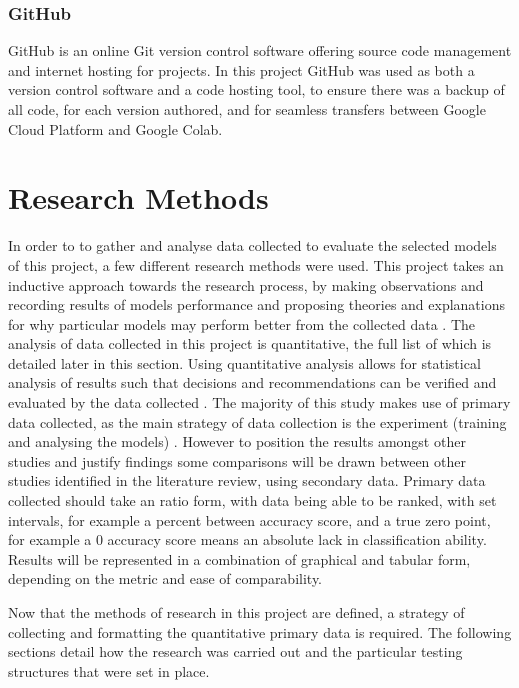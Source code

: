 \subsubsection{GitHub}
GitHub is an online Git version control software offering source code management and internet hosting for projects. In this project GitHub was used as both a version control software and a code hosting tool, to ensure there was a backup of all code, for each version authored, and for seamless transfers between Google Cloud Platform and Google Colab.

\section{Research Methods}
In order to to gather and analyse data collected to evaluate the selected models of this project, a few different research methods were used. This project takes an inductive approach towards the research process, by making observations and recording results of models performance and proposing theories and explanations for why particular models may perform better from the collected data \citep{saunders2009research}. The analysis of data collected in this project is quantitative, the full list of which is detailed later in this section. Using quantitative analysis allows for statistical analysis of results such that decisions and recommendations can be verified and evaluated by the data collected \citep{saunders2009research}. The majority of this study makes use of primary data collected, as the main strategy of data collection is the experiment (training and analysing the models) \citep{hox2005data}. However to position the results amongst other studies and justify findings some comparisons will be drawn between other studies identified in the literature review, using secondary data. Primary data collected should take an ratio form, with data being able to be ranked, with set intervals, for example a percent between accuracy score, and a true zero point, for example a 0 accuracy score means an absolute lack in classification ability. Results will be represented in a combination of graphical and tabular form, depending on the metric and ease of comparability. 

Now that the methods of research in this project are defined, a strategy of collecting and formatting the quantitative primary data is required. The following sections detail how the research was carried out and the particular testing structures that were set in place.

